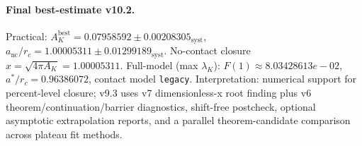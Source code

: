 \paragraph{Final best-estimate v10.2.}
Practical: $A_K^{\mathrm{best}} = 0.07958592 \pm 0.00208305_{\mathrm{syst}}$, $a_{\mathrm{nc}}/r_c = 1.00005311 \pm 0.01299189_{\mathrm{syst}}$.
No-contact closure $x = \sqrt{4\pi A_K} = 1.00005311$.
Full-model (max $\lambda_K$): $F(1) \approx 8.03428613e-02$, $a^*/r_c = 0.96386072$, contact model \texttt{legacy}.
Interpretation: numerical support for percent-level closure; v9.3 uses v7 dimensionless-x root finding plus v6 theorem/continuation/barrier diagnostics, shift-free postcheck, optional asymptotic extrapolation reports, and a parallel theorem-candidate comparison across plateau fit methods.
